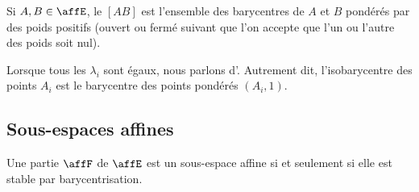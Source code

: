 \begin{definition}
	Si \( A,B\in \affE\), le  \( [AB]\) est l'ensemble des barycentres de \( A\) et \( B\) pondérés par des poids positifs (ouvert ou fermé suivant que l'on accepte que l'un ou l'autre des poids soit nul).
\end{definition}

Lorsque tous les \( \lambda_i\) sont égaux, nous parlons d'. Autrement dit, l'isobarycentre des points \( A_i\) est le barycentre des points pondérés \( (A_i,1)\).

\subsection{Sous-espaces affines}

\begin{proposition}
	Une partie \( \affF\) de \( \affE\) est un sous-espace affine si et seulement si elle est stable par barycentrisation.
\end{proposition}

